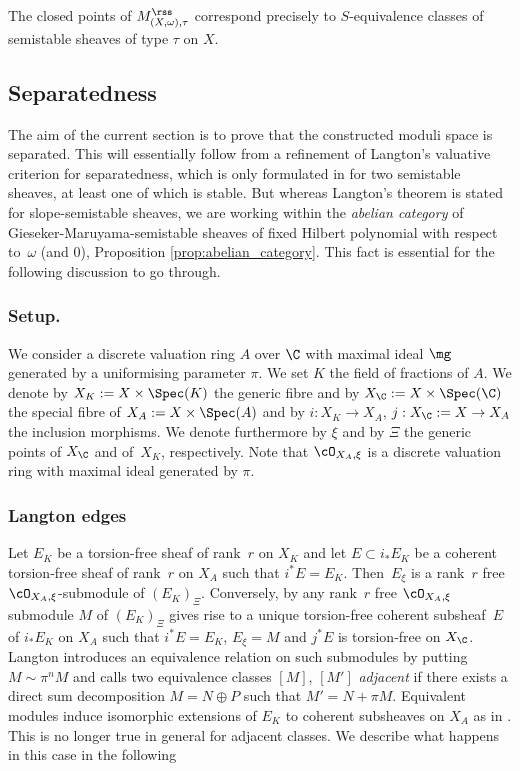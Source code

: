 \begin{Prop}\label{prop:points} The closed points of $M_{(X,\omega),\tau}^{{\rss}}$ correspond precisely to $S$-equivalence classes of semistable sheaves of type $\tau$ on $X$.
\end{Prop}

\subsection{Separatedness}

The aim of the current section is to prove that the constructed moduli space is separated. This will essentially follow from a refinement of Langton's valuative criterion for separatedness, which is only formulated in \cite{Langton} for two semistable sheaves, at least one of which is stable. But whereas Langton's theorem is stated for slope-semistable sheaves, we are working within the \emph{abelian category} of Gieseker-Maruyama-semistable sheaves of fixed Hilbert polynomial with respect to~$\omega$ (and $0$), \cf Proposition \ref{prop:abelian_category}. This fact is essential for the following discussion to go through.

\subsubsection*{Setup.} We consider a discrete valuation ring $A$ over $\C$ with maximal ideal $\mg$ generated by a uniformising parameter $\pi$. We set $K$ the field of fractions of $A$. We denote by $X_K:=X\times\Spec(K)$ the generic fibre and by $X_\C:=X\times\Spec(\C)$ the special fibre of $X_A:=X\times\Spec(A)$ and by $i:X_K\to X_A$, $j:X_\C:=X\to X_A$ the inclusion morphisms. We denote furthermore by $\xi$ and by $\Xi$ the generic points of $X_\C$ and of~$X_K$, respectively. Note that $\cO_{X_A,\xi}$ is a discrete valuation ring with maximal ideal generated by $\pi$.

\subsubsection*{Langton edges}
Let $E_K$ be a
torsion-free sheaf of rank~$r$ on $X_K$ and let $E\subset i_*E_K$ be a coherent torsion-free sheaf of rank~$r$ on $X_A$ such that $i^*E=E_K$.
Then~$E_\xi$ is a rank~$r$ free $\cO_{X_A,\xi}$-submodule of $(E_K)_\Xi$. Conversely, by \cite[Prop.\,6]{Langton} any rank~$r$ free $\cO_{X_A,\xi}$ submodule $M$ of $(E_K)_\Xi$ gives rise to a unique torsion-free coherent subsheaf~$E$ of $i_*E_K$ on $X_A$ such that $i^*E=E_K$, $E_\xi=M$ and $j^*E$ is torsion-free on $X_\C$.
Langton introduces an equivalence relation on such submodules by putting \hbox{$M\sim\pi^nM$} and calls two equivalence classes $[M]$, $[M']$ {\it adjacent} if there exists a direct sum decomposition $M=N\oplus P$ such that $M'=N+\pi M$.
Equivalent modules induce isomorphic extensions of $E_K$ to coherent subsheaves on $X_A$ as in \cite[Prop.\,6]{Langton}.
This is no longer true in general for adjacent classes. We describe what happens in this case in the following

